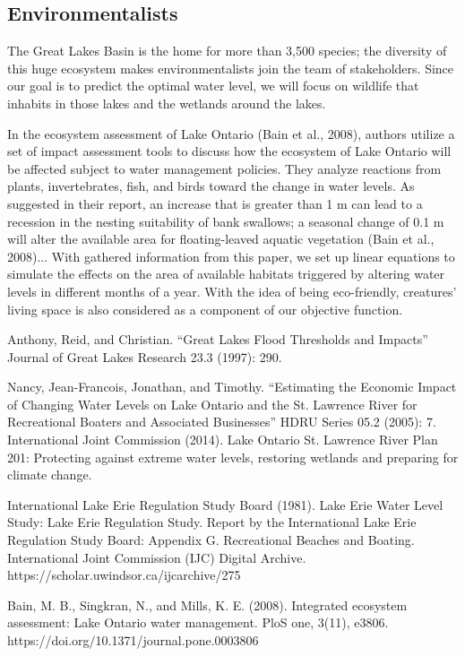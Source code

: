 \documentclass[pre,12pt]{revtex4-1}
\begin{document}
\subsection{Environmentalists}
The Great Lakes Basin is the home for more than 3,500 species; the diversity of this huge ecosystem makes environmentalists join the team of stakeholders. Since our goal is to predict the optimal water level, we will focus on wildlife that inhabits in those lakes and the wetlands around the lakes.\par
In the ecosystem assessment of Lake Ontario (Bain et al., 2008), authors utilize a set of impact assessment tools to discuss how the ecosystem of Lake Ontario will be affected subject to water management policies. They analyze reactions from plants, invertebrates, fish, and birds toward the change in water levels. As suggested in their report, an increase that is greater than 1 m can lead to a recession in the nesting suitability of bank swallows; a seasonal change of 0.1 m will alter the available area for floating-leaved aquatic vegetation (Bain et al., 2008)... With gathered information from this paper, we set up linear equations to simulate the effects on the area of available habitats triggered by altering water levels in different months of a year. With the idea of being eco-friendly, creatures' living space is also considered as a component of our objective function.

\begin{thebibliography}{10}
Anthony, Reid, and Christian. ``Great Lakes Flood Thresholds and Impacts'' Journal of Great Lakes Research 23.3 (1997): 290.

Nancy, Jean-Francois, Jonathan, and Timothy. ``Estimating the Economic Impact of Changing Water Levels on Lake Ontario and the St. Lawrence River for Recreational Boaters and Associated Businesses'' HDRU Series 05.2 (2005): 7.
 International Joint Commission (2014). Lake Ontario St. Lawrence River Plan 201: Protecting against
extreme water levels, restoring wetlands and preparing for climate change. 

 International Lake Erie Regulation Study Board (1981). Lake Erie Water Level Study: Lake Erie Regulation Study. Report by the International Lake Erie Regulation Study Board: Appendix G. Recreational Beaches and Boating. International Joint Commission (IJC) Digital Archive. https://scholar.uwindsor.ca/ijcarchive/275

Bain, M. B., Singkran, N., and Mills, K. E. (2008). Integrated ecosystem assessment: Lake Ontario water management. PloS one, 3(11), e3806. https://doi.org/10.1371/journal.pone.0003806
\end{thebibliography}
\end{document}
